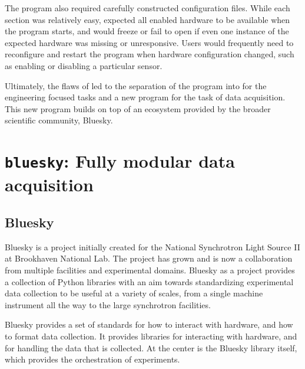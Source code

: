 The program also required carefully constructed configuration files.
While each section was relatively easy, \yaqccmds{} expected all enabled hardware to be available when the program starts, and would freeze or fail to open if even one instance of the expected hardware was missing or unresponsive.
Users would frequently need to reconfigure and restart the program when hardware configuration changed, such as enabling or disabling a particular sensor.

Ultimately, the flaws of \yaqccmds{} led to the separation of the program into \yaqcqtpy{} for the engineering focused tasks and a new program for the task of data acquisition.
This new program builds on top of an ecosystem provided by the broader scientific community, Bluesky\cite{}.

\clearpage

\section{\texttt{bluesky}: Fully modular data acquisition}

\subsection{Bluesky}


Bluesky is a project initially created for the National Synchrotron Light Source II at Brookhaven National Lab.
The project has grown and is now a collaboration from multiple facilities and experimental domains.
Bluesky as a project provides a collection of Python libraries with an aim towards standardizing experimental data collection to be useful at a variety of scales, from a single machine instrument all the way to the large synchrotron facilities.

Bluesky provides a set of standards for how to interact with hardware, and how to format data collection.
It provides libraries for interacting with hardware, and for handling the data that is collected.
At the center is the Bluesky library itself, which provides the orchestration of experiments.


